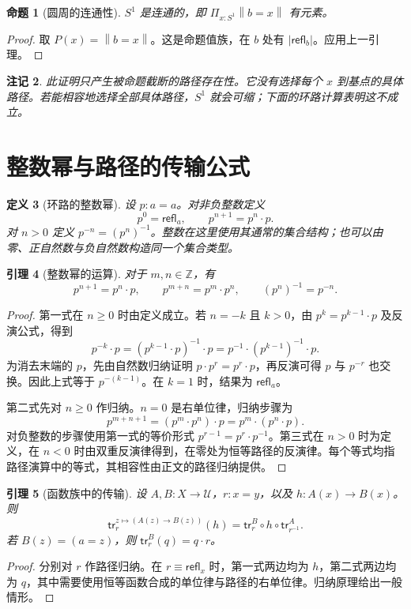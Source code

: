 \documentclass[12pt,oneside,openany,fontset=none]{ctexbook}
\theoremstyle{cn}
\newtheorem{definition}{定义}[chapter]
\newtheorem{lemma}[definition]{引理}
\newtheorem{proposition}[definition]{命题}
\newtheorem{remark}[definition]{注记}
\numberwithin{equation}{chapter}
\newcommand{\U}{\mathcal U}
\newcommand{\refl}{\mathsf{refl}}
\newcommand{\tr}{\mathsf{tr}}
\newcommand{\Z}{\mathbb Z}
\newcommand{\trunc}[1]{\left\|#1\right\|}
\begin{document}
\begin{proposition}[圆周的连通性]
$S^1$ 是连通的，即 $\Pi_{x:S^1}\trunc{b=x}$ 有元素。
\end{proposition}
\begin{proof}
取 $P(x)=\trunc{b=x}$。这是命题值族，在 $b$ 处有 $|\refl_b|$。应用上一引理。
\end{proof}

\begin{remark}
此证明只产生被命题截断的路径存在性。它没有选择每个 $x$ 到基点的具体路径。若能相容地选择全部具体路径，$S^1$ 就会可缩；下面的环路计算表明这不成立。
\end{remark}

\section{整数幂与路径的传输公式}

\begin{definition}[环路的整数幂]
设 $p:a=a$。对非负整数定义
\[
 p^0=\refl_a,\qquad p^{n+1}=p^n\cdot p.
\]
对 $n>0$ 定义 $p^{-n}=(p^n)^{-1}$。整数在这里使用其通常的集合结构；也可以由零、正自然数与负自然数构造同一个集合类型。
\end{definition}

\begin{lemma}[整数幂的运算]
对于 $m,n\in\Z$，有
\[
 p^{n+1}=p^n\cdot p,\qquad
 p^{m+n}=p^m\cdot p^n,\qquad
 (p^n)^{-1}=p^{-n}.
\]
\end{lemma}
\begin{proof}
第一式在 $n\geq0$ 时由定义成立。若 $n=-k$ 且 $k>0$，由 $p^k=p^{k-1}\cdot p$ 及反演公式，得到
\[
 p^{-k}\cdot p
 =(p^{k-1}\cdot p)^{-1}\cdot p
 =p^{-1}\cdot(p^{k-1})^{-1}\cdot p.
\]
为消去末端的 $p$，先由自然数归纳证明 $p\cdot p^r=p^r\cdot p$，再反演可得 $p$ 与 $p^{-r}$ 也交换。因此上式等于 $p^{-(k-1)}$。在 $k=1$ 时，结果为 $\refl_a$。

第二式先对 $n\geq0$ 作归纳。$n=0$ 是右单位律，归纳步骤为
\[
 p^{m+n+1}=(p^m\cdot p^n)\cdot p
 =p^m\cdot(p^n\cdot p).
\]
对负整数的步骤使用第一式的等价形式 $p^{r-1}=p^r\cdot p^{-1}$。第三式在 $n>0$ 时为定义，在 $n<0$ 时由双重反演律得到，在零处为恒等路径的反演律。每个等式均指路径演算中的等式，其相容性由正文的路径归纳提供。
\end{proof}

\begin{lemma}[函数族中的传输]
设 $A,B:X\to\U$，$r:x=y$，以及 $h:A(x)\to B(x)$。则
\[
 \tr^{z\mapsto(A(z)\to B(z))}_r(h)
 =\tr^B_r\circ h\circ\tr^A_{r^{-1}}.
\]
若 $B(z)=(a=z)$，则 $\tr^B_r(q)=q\cdot r$。
\end{lemma}
\begin{proof}
分别对 $r$ 作路径归纳。在 $r\equiv\refl_x$ 时，第一式两边均为 $h$，第二式两边均为 $q$，其中需要使用恒等函数合成的单位律与路径的右单位律。归纳原理给出一般情形。
\end{proof}
\end{document}
